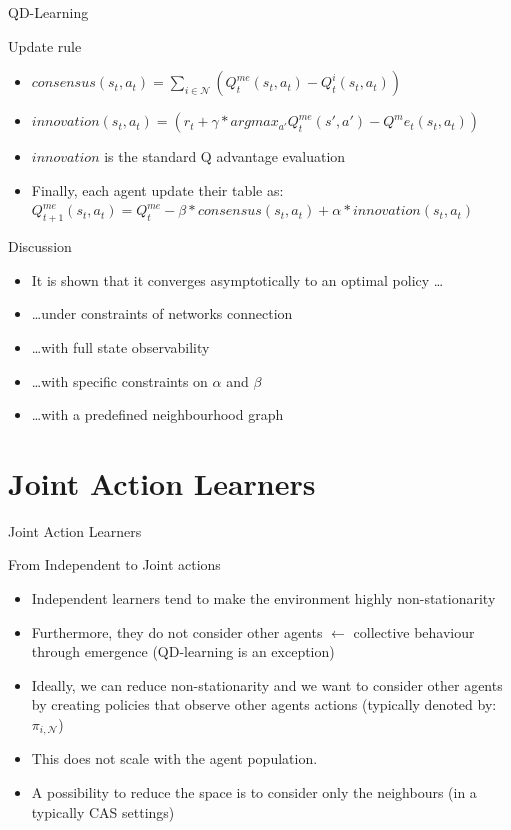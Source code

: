 \documentclass[presentation]{beamer}\mode<presentation>{\usetheme{AMSBolognaFC}}
\begin{document}
\begin{frame}{QD-Learning}
	\begin{exampleblock}{Update rule}
		\begin{itemize}
			\item $consensus(s_t, a_t) = \sum_{i \in \mathcal{N}} (Q^{me}_t(s_t, a_t) - Q^i_t(s_t, a_t))$
			\item $innovation(s_t, a_t) = (r_t + \gamma*argmax_{a'}Q^{me}_t(s', a') - Q^me_t(s_t, a_t))$
			\item $innovation$ is the standard Q advantage evaluation
			\item Finally, each agent update their table as: $Q^{me}_{t + 1}(s_t, a_t) = Q^{me}_t - \beta * consensus(s_t, a_t) + \alpha * innovation(s_t, a_t)$
		\end{itemize}		
	\end{exampleblock}
	\begin{alertblock}{Discussion}
		\begin{itemize}
			\item[{\color{teal} \faThumbsUp}] It is shown that it converges asymptotically to an optimal policy \dots
			\item[{\color{red} \faThumbsDown}]\dots under constraints of networks connection
			\item[{\color{red} \faThumbsDown}]\dots with full state observability
			\item[{\color{red} \faThumbsDown}]\dots with specific constraints on $\alpha$ and $\beta$ 
			\item[{\color{red} \faThumbsDown}]\dots with a predefined neighbourhood graph 
		\end{itemize}
	\end{alertblock}
\end{frame}
\section{Joint Action Learners}

\begin{frame}{Joint Action Learners}
	\begin{alertblock}{From Independent to Joint actions}	
		\begin{itemize}
			\item Independent learners tend to make the environment highly non-stationarity
			\item Furthermore, they do not consider other agents $\leftarrow$ collective behaviour through emergence (QD-learning is an exception)
			\item Ideally, we can reduce non-stationarity and we want to consider other agents by creating policies that observe other agents actions (typically denoted by: $\pi_{i,\mathcal{N}}$)
			\item This does not scale with the agent population.
			\item A possibility to reduce the space is to consider only the neighbours (in a typically CAS settings)
		\end{itemize}
	\end{alertblock}
\end{frame}
\end{document}
